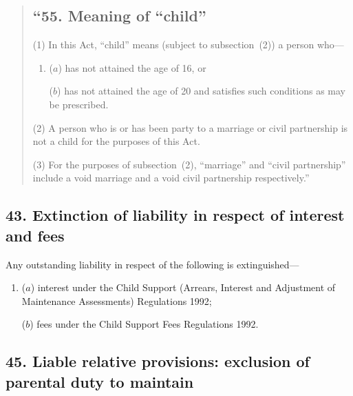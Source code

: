 \documentclass[12pt,a4paper]{article}
\begin{document}
\begin{quotation}
\subsection*{``55. Meaning of ``child''}

(1) In this Act, “child” means (subject to subsection~(2)) a person who---
\begin{enumerate}\item[]
($a$) has not attained the age of 16, or

($b$) has not attained the age of 20 and satisfies such conditions as may be prescribed.
\end{enumerate}

(2)
A person who is or has been party to a marriage or civil partnership is not a child for the purposes of this Act.

(3)
For the purposes of subsection~(2), “marriage” and “civil partnership” include a void marriage and a void civil partnership respectively.''
\end{quotation}

\subsection{43. Extinction of liability in respect of interest and fees}

Any outstanding liability in respect of the following is extinguished—
\begin{enumerate}\item[]
($a$) interest under the Child Support (Arrears, Interest and Adjustment of Maintenance Assessments) Regulations 1992;

($b$) fees under the Child Support Fees Regulations 1992.
\end{enumerate}

%


\subsection{45. Liable relative provisions: exclusion of parental duty to maintain}
\end{document}
